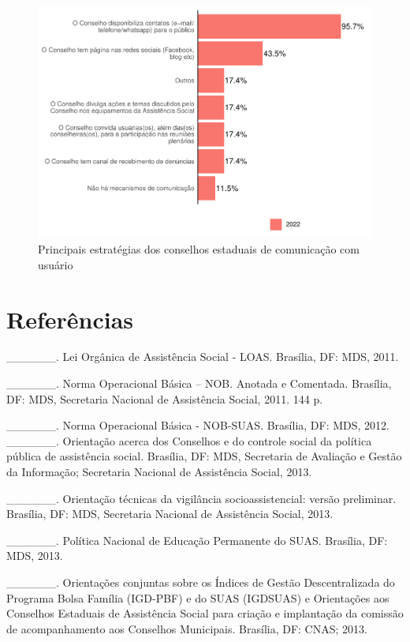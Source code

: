 \documentclass[
  brazilian]{report}
\begin{document}
\begin{figure}
\includegraphics{Censo-SUAS-2022_files/figure-latex/ceas_usu-1} \caption[Principais estratégias dos conselhos estaduais de comunicação com usuário]{Principais estratégias dos conselhos estaduais de comunicação com usuário}\label{fig:ceas_usu}
\end{figure}

\hypertarget{referuxeancias}{%
\chapter{Referências}\label{referuxeancias}}

\_\_\_\_\_\_. Lei Orgânica de Assistência Social - LOAS. Brasília, DF:
MDS, 2011.

\_\_\_\_\_\_. Norma Operacional Básica -- NOB. Anotada e Comentada.
Brasília, DF: MDS, Secretaria Nacional de Assistência Social, 2011. 144
p.~

\_\_\_\_\_\_. Norma Operacional Básica - NOB-SUAS. Brasília, DF: MDS,
2012. \_\_\_\_\_\_. Orientação acerca dos Conselhos e do controle social
da política pública de assistência social. Brasília, DF: MDS, Secretaria
de Avaliação e Gestão da Informação; Secretaria Nacional de Assistência
Social, 2013.

\_\_\_\_\_\_. Orientação técnicas da vigilância socioassistencial:
versão preliminar. Brasília, DF: MDS, Secretaria Nacional de Assistência
Social, 2013.

\_\_\_\_\_\_. Política Nacional de Educação Permanente do SUAS.
Brasília, DF: MDS, 2013.

\_\_\_\_\_\_. Orientações conjuntas sobre os Índices de Gestão
Descentralizada do Programa Bolsa Família (IGD-PBF) e do SUAS (IGDSUAS)
e Orientações aos Conselhos Estaduais de Assistência Social para criação
e implantação da comissão de acompanhamento aos Conselhos Municipais.
Brasília, DF: CNAS; 2013.
\end{document}
